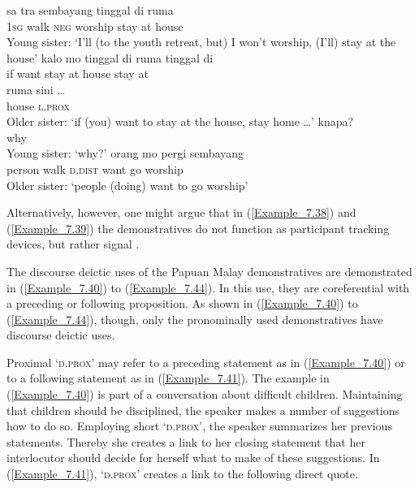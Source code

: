 {\ea
\label{Example_7.39}
\ea
\label{Example_7.39a}
 {sa} {} {tra} {sembayang} {tinggal} {di} {ruma}\\ %
  { }    \textsc{1sg}  walk  \textsc{neg}  worship  stay  at  house\\
\glt
Young sister: ‘I’ll  (to the youth retreat, but) I won’t worship, (I’ll) stay at the house’
\vspace{10pt}
\ex
\label{Example_7.39b}
  kalo  {mo}  {tinggal}  di  ruma  tinggal  di\\
 { }      if  {want}  {stay}  at  house  stay  at\\
\gll  { }      {ruma}  {sini}  {\ldots}\\
 { } {house} \textsc{l.prox}\\
\glt Older sister: ‘if (you) want to stay at the house, stay home \ldots’
\vspace{10pt}
\ex
\label{Example_7.39c}
  knapa?\\
    { }   why\\
\glt
Young sister: ‘why?’
\vspace{10pt}
\ex
\label{Example_7.39d}
  orang      mo  pergi  sembayang\\
   { }  person  walk  \textsc{d.dist}  want  go  worship\\
\glt
Older sister: ‘people (doing)  want to go worship’ \textstyleExampleSource{[081006-016-Cv.0012-0015]}
\z
\z


Alternatively, however, one might argue that in (\ref{Example_7.38}) and (\ref{Example_7.39}) the demonstratives do not function as participant tracking devices, but rather signal .



The discourse deictic uses of the Papuan Malay de\-mon\-stratives are demonstrated in (\ref{Example_7.40}) to (\ref{Example_7.44}). In this use, they are coreferential with a preceding or following proposition. As shown in (\ref{Example_7.40}) to (\ref{Example_7.44}), though, only the pronominally used demonstratives have discourse deictic uses.



Proximal  ‘\textsc{d.prox}’ may refer to a preceding statement as in (\ref{Example_7.40}) or to a following statement as in (\ref{Example_7.41}). The example in (\ref{Example_7.40}) is part of a conversation about difficult children. Maintaining that children should be disciplined, the speaker makes a number of suggestions how to do so. Employing short  ‘\textsc{d.prox}’, the speaker summarizes her previous statements. Thereby she creates a link to her closing statement that her interlocutor should decide for herself what to make of these suggestions. In (\ref{Example_7.41}),  ‘\textsc{d.prox}’ creates a link to the following direct quote.


}

